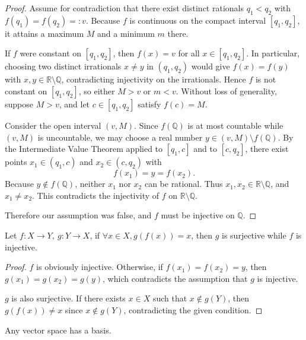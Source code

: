 \begin{proof}
Assume for contradiction that there exist distinct rationals $q_1<q_2$ with
$f(q_1)=f(q_2)=:v$. Because $f$ is continuous on the compact interval $[q_1,q_2]$,
it attains a maximum $M$ and a minimum $m$ there.

If $f$ were constant on $[q_1,q_2]$, then $f(x)=v$ for all $x\in[q_1,q_2]$.
In particular, choosing two distinct irrationals $x\neq y$ in $(q_1,q_2)$ would give
$f(x)=f(y)$ with $x,y\in\mathbb{R}\setminus\mathbb{Q}$, contradicting injectivity on
the irrationals. Hence $f$ is not constant on $[q_1,q_2]$, so either $M>v$ or $m<v$.
Without loss of generality, suppose $M>v$, and let $c\in[q_1,q_2]$ satisfy $f(c)=M$.

Consider the open interval $(v,M)$. Since $f(\mathbb{Q})$ is at most countable while $(v,M)$
is uncountable, we may choose a real number $y\in(v,M)\setminus f(\mathbb{Q})$.
By the Intermediate Value Theorem applied to $[q_1,c]$ and to $[c,q_2]$, there exist points
$x_1\in(q_1,c)$ and $x_2\in(c,q_2)$ with
\[
f(x_1)=y=f(x_2).
\]
Because $y\notin f(\mathbb{Q})$, neither $x_1$ nor $x_2$ can be rational.
Thus $x_1,x_2\in\mathbb{R}\setminus\mathbb{Q}$, and $x_1\neq x_2$.
This contradicts the injectivity of $f$ on $\mathbb{R}\setminus\mathbb{Q}$.

Therefore our assumption was false, and $f$ must be injective on $\mathbb{Q}$.
\end{proof}

\begin{exercise}
    Let $f: X \to Y,\: g: Y \to X$, if $\forall x \in X, g(f(x)) = x$, then $g$ is surjective 
    while $f$ is injective.
\end{exercise}

\begin{proof}
    $f$ is obviously injective. Otherwise, if $f(x_1) = f(x_2) = y$, then $g(x_1) = g(x_2) = g(y)$, which contradicts the assumption that
    $g$ is injective.

    $g$ is also surjective. If there exists $x \in X$ such that $x \notin g(Y)$, then $g(f(x)) \ne x$ since $x \notin g(Y)$, 
    contradicting the given condition.
\end{proof}

\begin{exercise}
    Any vector space has a basis.
\end{exercise}


